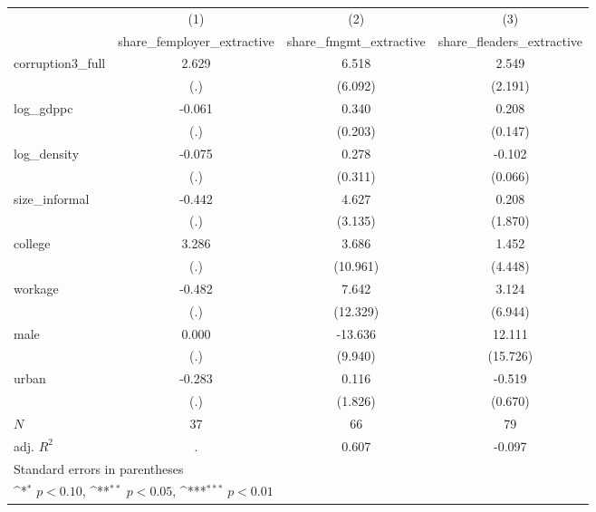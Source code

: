 {
\def\sym#1{\ifmmode^{#1}\else\(^{#1}\)\fi}
\begin{tabular}{l*{3}{c}}
\hline\hline
            &\multicolumn{1}{c}{(1)}&\multicolumn{1}{c}{(2)}&\multicolumn{1}{c}{(3)}\\
            &\multicolumn{1}{c}{share\_femployer\_extractive}&\multicolumn{1}{c}{share\_fmgmt\_extractive}&\multicolumn{1}{c}{share\_fleaders\_extractive}\\
\hline
corruption3\_full&       2.629         &       6.518         &       2.549         \\
            &         (.)         &     (6.092)         &     (2.191)         \\
[1em]
log\_gdppc   &      -0.061         &       0.340         &       0.208         \\
            &         (.)         &     (0.203)         &     (0.147)         \\
[1em]
log\_density &      -0.075         &       0.278         &      -0.102         \\
            &         (.)         &     (0.311)         &     (0.066)         \\
[1em]
size\_informal&      -0.442         &       4.627         &       0.208         \\
            &         (.)         &     (3.135)         &     (1.870)         \\
[1em]
college     &       3.286         &       3.686         &       1.452         \\
            &         (.)         &    (10.961)         &     (4.448)         \\
[1em]
workage     &      -0.482         &       7.642         &       3.124         \\
            &         (.)         &    (12.329)         &     (6.944)         \\
[1em]
male        &       0.000         &     -13.636         &      12.111         \\
            &         (.)         &     (9.940)         &    (15.726)         \\
[1em]
urban       &      -0.283         &       0.116         &      -0.519         \\
            &         (.)         &     (1.826)         &     (0.670)         \\
\hline
\(N\)       &          37         &          66         &          79         \\
adj. \(R^{2}\)&           .         &       0.607         &      -0.097         \\
\hline\hline
\multicolumn{4}{l}{\footnotesize Standard errors in parentheses}\\
\multicolumn{4}{l}{\footnotesize \sym{*} \(p<0.10\), \sym{**} \(p<0.05\), \sym{***} \(p<0.01\)}\\
\end{tabular}
}
